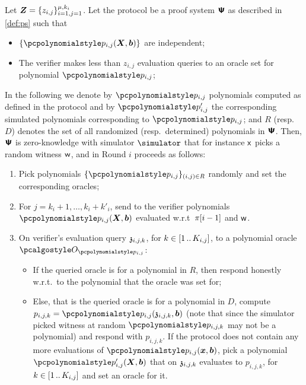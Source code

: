 \documentclass[runningheads,11pt]{llncs}
\let\spvec\vec
\let\vec\accentvec
\let\spvec\vec
\let\vec\spvec
\def\vec#1{\mathchoice{\mbox{\boldmath$\displaystyle#1$}}
  {\mbox{\boldmath$\textstyle#1$}} {\mbox{\boldmath$\scriptstyle#1$}}
  {\mbox{\boldmath$\scriptscriptstyle#1$}}}
\begin{document}
\begin{theorem}[$\vec{Z}$-Zero knowledge]
  \label{def:ips_zk}
  Let $\vec{Z} = \smallset{z_{i, j}}_{i = 1, j = 1}^{\mu, k_i}$. Let the protocol be
  a proof system $\bm{\mathsf{\Psi}}$ as described in \cref{def:ps} such that
  \begin{itemize}
  \item $\smallset{\p{p}_{i, j} (\vec{X}, \vec{b})}$ are independent;
  \item The verifier makes less than $z_{i, j}$ evaluation queries to an oracle set
    for polynomial $\p{p}_{i, j}$;
  \end{itemize}
  In the following we denote by $\p{p}_{i, j}$ polynomials computed as defined in the
  protocol and by $\p{p}'_{i, j}$ the corresponding simulated polynomials
  corresponding to $\p{p}_{i, j}$; and $R$ (resp.~$D$) denotes the set of all randomized
  (resp.~determined) polynomials in $\bm{\mathsf{\Psi}}$. Then, $\bm{\mathsf{\Psi}}$ is zero-knowledge with
  simulator $\simulator$ that for instance $\mathsf{x}$ picks a random witness $\mathsf{w}$, and
  in Round $i$ proceeds as follows:
  \begin{enumerate}
  \item Pick polynomials $\smallset{\p{p}_{i, j}}_{(i, j) \in R}$ randomly and set
    the corresponding oracles;
  \item For $j = k_i + 1, \ldots, k_i + k'_i$, send to the verifier polynomials
    $\p{p}_{i, j} (\vec{X}, \vec{b})$ evaluated w.r.t~$\pi[i - 1]$ and
    $\mathsf{w}$. 
  \item On verifier's evaluation query $\mathfrak{z}_{i, j, k}$, for $k \in [1 \, .. \, K_{i, j}]$, to a
    polynomial oracle $\oracleo_{\p{p}_{i, j}}$:
    \begin{itemize}
    \item If the queried oracle is for a polynomial in $R$, then respond honestly
      w.r.t.~to the polynomial that the oracle was set for;
    \item Else, that is the queried oracle is for a polynomial in $D$, compute
      $p_{i, j, k} = \p{p}_{i, j} (\chz_{i, j, k}, \vec{b})$ (note that since the
      simulator picked witness at random $\p{p}_{i, j, k}$ may not be a polynomial)
      and respond with $p_{i, j, k}$. If the protocol does not contain any more
      evaluations of $\p{p}_{i, j} (\vec{x}, \vec{b})$, pick a polynomial
      $\p{p}'_{i, j} (\vec{X}, \vec{b})$ that on $\mathfrak{z}_{i, j, k}$ evaluates to
      $p_{i, j, k}$, for $k \in [1 \, .. \, K_{i, j}]$ and set an oracle for it.
    \end{itemize}
  \end{enumerate}
\end{theorem}
\end{document}
